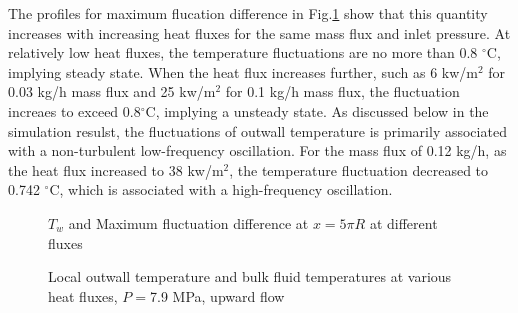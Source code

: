 \documentclass[a4paper,12pt]{article}
\begin{document}
The profiles for maximum flucation difference in Fig.\ref{$T_w$ and} show that this quantity increases with increasing heat fluxes for the same mass flux and inlet pressure.  At relatively low heat fluxes, the temperature fluctuations are no more than 0.8 $^{\circ}$C, implying steady state. When the heat flux increases further, such as 6 kw/m$^2$ for 0.03 kg/h mass flux and 25 kw/m$^2$ for 0.1 kg/h mass flux, the fluctuation increaes to exceed 0.8$^{\circ}$C, implying a unsteady state. As discussed below in the simulation resulst, the fluctuations of outwall temperature is primarily associated with a non-turbulent low-frequency oscillation. For the mass flux of 0.12 kg/h, as the heat flux increased to 38 kw/m$^2$, the temperature fluctuation decreased to 0.742 $^{\circ}$C, which is associated with a high-frequency oscillation.
\begin{figure}
	\centering
	\caption{$T_w$ and Maximum fluctuation difference  at $x=5\pi R$ at different fluxes}\label{$T_w$ and}
\end{figure}


\begin{figure}
	\centering
	\caption{Local outwall temperature and bulk fluid temperatures at various heat fluxes, $P=$7.9 MPa, upward flow}\label{local outwall}
\end{figure}
\end{document}
